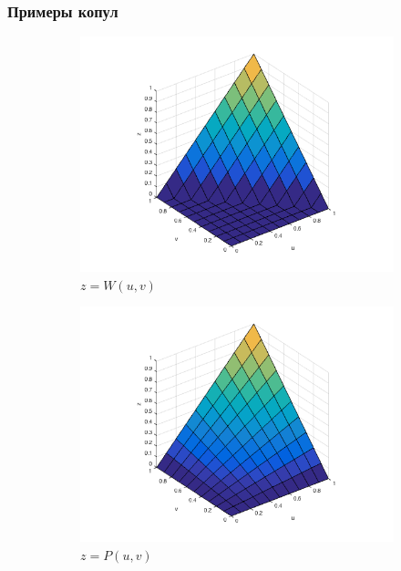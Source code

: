 \documentclass[11pt]{beamer}
\begin{document}
\begin{frame}
\frametitle{Примеры копул}
\begin{figure}[H]
  \centering
  \begin{subfigure}{.3\textwidth}
    \centering
    \includegraphics[width=\linewidth]{W.png}
    \caption{$z = W(u, v)$}
  \end{subfigure}%
  \begin{subfigure}{.3\textwidth}
    \centering
    \includegraphics[width=\linewidth]{P.png}
    \caption{$z = P(u, v)$}
  \end{subfigure}
  \begin{subfigure}{.3\textwidth}
    \centering

\end{subfigure}
\end{figure}
\end{frame}
\end{document}
